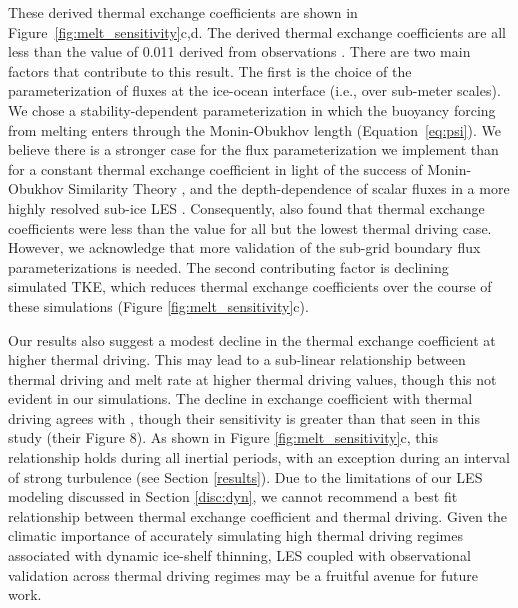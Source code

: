 \documentclass[tc, manuscript]{copernicus}
\begin{document}
These derived thermal exchange coefficients are shown in Figure~\ref{fig:melt_sensitivity}c,d. The derived thermal exchange coefficients are all less than the value of 0.011 derived from observations \citep{jenkins_observation_2010}. There are two main factors that contribute to this result. The first is the choice of the parameterization of fluxes at the ice-ocean interface (i.e., over sub-meter scales). We chose a stability-dependent parameterization in which the buoyancy forcing from melting enters through the Monin-Obukhov length (Equation~\ref{eq:psi}). We believe there is a stronger case for the flux parameterization we implement than for a constant thermal exchange coefficient in light of the success of Monin-Obukhov Similarity Theory \citep{monin_basic_1954, mcphee_air-ice-ocean_2008}, and the depth-dependence of scalar fluxes in a more highly resolved sub-ice LES \citep{vreugdenhil_stratification_2019}. Consequently, \citet{vreugdenhil_stratification_2019} also found that thermal exchange coefficients were less than the \citet{jenkins_observation_2010} value for all but the lowest thermal driving case. However, we acknowledge that more validation of the sub-grid boundary flux parameterizations is needed. The second contributing factor is declining simulated TKE, which reduces thermal exchange coefficients over the course of these simulations (Figure \ref{fig:melt_sensitivity}c). 

Our results also suggest a modest decline in the thermal exchange coefficient at higher thermal driving. This may lead to a sub-linear relationship between thermal driving and melt rate at higher thermal driving values, though this not evident in our simulations. The decline in exchange coefficient with thermal driving agrees with \citet{vreugdenhil_stratification_2019}, though their sensitivity is greater than that seen in this study (their Figure 8). As shown in Figure \ref{fig:melt_sensitivity}c, this relationship holds during all inertial periods, with an exception during an interval of strong turbulence (see Section \ref{results}). Due to the limitations of our LES modeling discussed in Section \ref{disc:dyn}, we cannot recommend a best fit relationship between thermal exchange coefficient and thermal driving. Given the climatic importance of accurately simulating high thermal driving regimes associated with dynamic ice-shelf thinning, LES coupled with observational validation across thermal driving regimes may be a fruitful avenue for future work.
\end{document}
